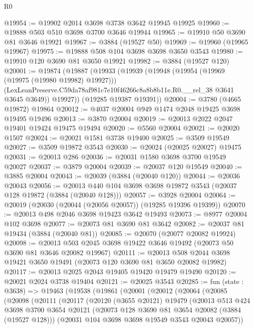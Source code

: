 \begin{lexlean}{R0}
\begin{coremodule}
@19954 := @19902 @2014 @3698 @3738 @3642 @19945 @19925
@19960 := @19888 @503 @510 @3698 @3700 @3646 @19944
@19965 := @19910 @50 @3690 @81 @3646 @19921
@19967 := @3884 (@19527 @50)
@19969 := @19960 (@19965 @19967)
@19975 := @19888 @508 @104 @3698 @3698 @3650 @3543
@19980 := @19910 @120 @3690 @81 @3650 @19921
@19982 := @3884 (@19527 @120)
@20001 := @19874
    (@19887
      (@19933
        (@19939
          (@19948
            (@19954 (@19969 (@19975 (@19980 @19982) @19927)))
            (LexLeanPreserve.C59da78af981c7e10f46266c8a8b8b11e.R0.__rel_38 @3641 @3645 @3649))
          @19927))
      (@19285 @19387 @19391))
@20004 := @3780 (@4665 @19872) @19864
@20012 := @4037 @20004 @949 @1474 @2048 @19425 @3698 @19495 @19496
@20013 := @3870 @20004
@20019 := @20013 @2022 @2047 @19401 @19424 @19475 @19494
@20020 := @5560 @20004
@20021 := @20020 @1507
@20024 := @20021 @1581 @3738 @19400
@20025 := @3509 @19549
@20027 := @3509 @19872 @3543
@20030 := @20024 (@20025 @20027) @19475
@20031 := @20013 @286
@20036 := @20031 @1580 @3698 @3700 @19549 @20027
@20037 := @3879 @20004
@20039 := @20037 @120 @19549
@20040 := @3885 @20004
@20043 := @20039 (@3884 (@20040 @120))
@20044 := @20036 @20043
@20056 := @20013 @440 @104 @3698 @3698 @19872 @3543 (@20037 @128 @19872 (@3884 (@20040 @128)))
@20057 := @3928 @20004
@20064 := @20019 (@20030 (@20044 (@20056 @20057)) (@19285 @19396 @19399))
@20070 := @20013 @498 @2046 @3698 @19423 @3642 @19493
@20073 := @8977 @20004 @102 @3698
@20077 := @20073 @81 @3690 @81 @3642
@20082 := @20037 @81 @19434 (@3884 (@20040 @81))
@20085 := @20070 (@20077 @20082 @19924)
@20098 := @20013 @503 @2045 @3698 @19422 @3646 @19492 (@20073 @50 @3690 @81 @3646 @20082 @19967)
@20111 := @20013 @508 @2044 @3698 @19421 @3650 @19491 (@20073 @120 @3690 @81 @3650 @20082 @19982)
@20117 := @20013 @2025 @2043 @19405 @19420 @19479 @19490
@20120 := @20021 @2024 @3738 @19404
@20121 := @20025 @3543
@20285 := fun (state : @3638) =>
  @19463
    (@19538
      (@19861
        (@20001
          (@20012
            (@20064
              (@20085
                (@20098
                  (@20111
                    (@20117
                      (@20120
                        (@3655 @20121)
                        @19479
                        (@20013
                          @513
                          @424
                          @3698
                          @3700
                          @3654
                          @20121
                          (@20073 @128 @3690 @81 @3654 @20082 (@3884 (@19527 @128)))
                          (@20031 @104 @3698 @3698 @19549 @3543 @20043 @20057))

\end{coremodule}
\end{lexlean}

